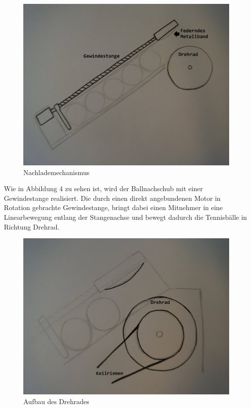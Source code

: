 \begin{figure}[h!]
	\centering
	\includegraphics[scale=0.35]{../../fig/Ballnachlader.jpg}
	\caption{Nachlademechanismus}
\end{figure}
Wie in Abbildung 4 zu sehen ist, wird der Ballnachschub mit einer Gewindestange realisiert. Die durch einen direkt angebundenen Motor in Rotation gebrachte Gewindestange, bringt dabei einen Mitnehmer in eine Linearbewegung entlang der Stangenachse und bewegt dadurch die Tennisbälle in Richtung Drehrad.
\begin{figure}[h!]
	\centering
	\includegraphics[scale=0.35]{../../fig/Drehrad.jpg}
	\caption{Aufbau des Drehrades}
\end{figure}
